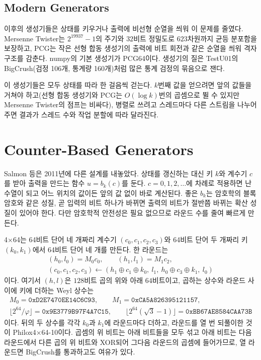 \subsection{Modern Generators}

이후의 생성기들은 상태를 키우거나 출력에 비선형 순열을 씌워 이 문제를 줄였다. Mersenne Twister는 $2^{19937}-1$의 주기와 $32$비트 정밀도로 $623$차원까지 균등 분포함을 보장하고\cite{matsumoto1998}, PCG는 작은 선형 합동 생성기의 출력에 비트 회전과 같은 순열을 씌워 격자 구조를 감춘다\cite{oneill2014pcg}. numpy의 기본 생성기가 PCG64이다. 생성기의 질은 TestU01의 BigCrush(검정 106개, 통계량 160개)처럼 많은 통계 검정의 묶음으로 잰다\cite{lecuyer2007}.

이 생성기들은 모두 상태를 따라 한 걸음씩 걷는다. $k$번째 값을 얻으려면 앞의 값들을 거쳐야 하고(선형 합동 생성기와 PCG는 $O(\log k)$번의 곱셈으로 뛸 수 있지만 Mersenne Twister의 점프는 비싸다), 병렬로 쓰려고 스레드마다 다른 스트림을 나누어 주면 결과가 스레드 수와 작업 분할에 따라 달라진다.

\section{Counter-Based Generators}
\label{sec:counter-based}

Salmon 등은 2011년에 다른 설계를 내놓았다\cite{salmon2011random123}. 상태를 갱신하는 대신 키 $k$와 계수기 $c$를 받아 출력을 만드는 함수 $u=b_k(c)$를 둔다. $c=0,1,2,\dots$에 차례로 적용하면 난수열이 되고 어느 위치의 값이든 앞의 값 없이 바로 계산된다. 좋은 $b_k$는 암호학의 블록 암호와 같은 성질, 곧 입력의 비트 하나가 바뀌면 출력의 비트가 절반쯤 바뀌는 확산 성질이 있어야 한다. 다만 암호학적 안전성은 필요 없으므로 라운드 수를 줄여 빠르게 만든다.

4×64는 64비트 단어 네 개짜리 계수기 $(c_0,c_1,c_2,c_3)$와 64비트 단어 두 개짜리 키 $(k_0,k_1)$에서 64비트 단어 네 개를 만든다. 한 라운드는
\begin{gather*}
(h_0,l_0)=M_0c_0,\qquad(h_1,l_1)=M_1c_2,\\
(c_0,c_1,c_2,c_3)\gets(h_1\oplus c_1\oplus k_0,\ l_1,\ h_0\oplus c_3\oplus k_1,\ l_0)
\end{gather*}
이다. 여기서 $(h,l)$은 $128$비트 곱의 위와 아래 $64$비트이고, 곱하는 상수와 라운드 사이에 키에 더하는 Weyl 상수는
\begin{gather*}
M_0=\texttt{0xD2E7470EE14C6C93},\qquad M_1=\texttt{0xCA5A826395121157},\\
\lfloor2^{64}/\varphi\rfloor=\texttt{0x9E3779B97F4A7C15},\qquad\lfloor2^{64}(\sqrt3-1)\rfloor=\texttt{0xBB67AE8584CAA73B}
\end{gather*}
이다. 뒤의 두 상수를 각각 $k_0$과 $k_1$에 라운드마다 더하고, 라운드를 열 번 되풀이한 것이 Philox4×64-10이다. 곱셈의 위 비트는 아래 비트들을 모두 섞고 아래 비트는 다음 라운드에서 다른 곱의 위 비트와 XOR되어 그다음 라운드의 곱셈에 들어가므로, 열 라운드면 BigCrush를 통과하고도 여유가 있다.

